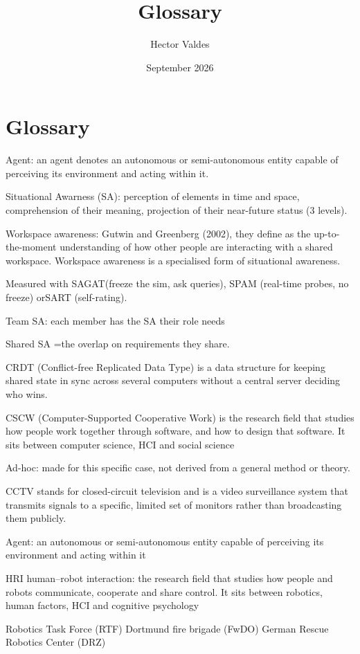 \documentclass{article}
\title{Glossary}
\author{Hector Valdes}
\date{September 2026}
\begin{document}
\maketitle

\section{Glossary}
Agent: an agent denotes an autonomous or semi-autonomous entity capable of perceiving its environment and acting within it. 

Situational Awarness (SA): perception of elements in time and space, comprehension of their meaning, projection of their near-future status (3 levels). 

Workspace awareness: Gutwin and Greenberg (2002), they define  as the up-to-the-moment understanding of how other people are interacting with a shared workspace. Workspace awareness is a specialised form of situational awareness. 

Measured with SAGAT(freeze the sim, ask queries), SPAM (real-time probes, no freeze) orSART (self-rating). 

Team SA: each member has the SA their role needs 

Shared SA =the overlap on requirements they share. 

CRDT (Conflict-free Replicated Data Type) is a data structure for keeping shared state in sync across several computers without a central server deciding who wins. 

CSCW (Computer-Supported Cooperative Work) is the research field that studies how people work together through software, and how to design that software. It sits between computer science, HCI and social science 

Ad-hoc: made for this specific case, not derived from a general method or theory. 

CCTV stands for closed-circuit television and is a video surveillance system that transmits signals to a specific, limited set of monitors rather than broadcasting them publicly.

Agent: an autonomous or semi-autonomous entity capable of perceiving its environment and acting within it

HRI human–robot interaction: the research field that studies how people and robots communicate, cooperate and share control. It sits between robotics, human factors, HCI and cognitive psychology

Robotics Task Force (RTF)
Dortmund fire brigade (FwDO)
German Rescue Robotics Center (DRZ)
\end{document}

